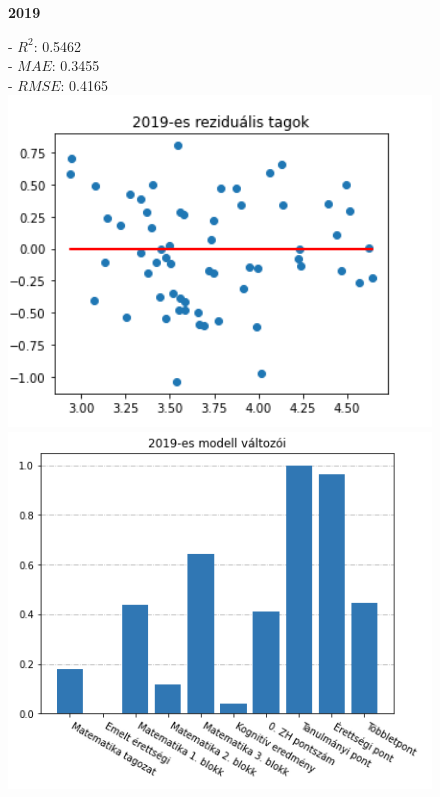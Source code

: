 \documentclass[12pt]{article}
\begin{document}
\begin{figure}[H]
    \centering
    \begin{minipage}[b]{0.4\textwidth}
    \begin{center}
    \textbf{2019}
    \end{center}
    \raggedright
    - $R^2$: 0.5462 \\
    - $MAE$: 0.3455 \\
    - $RMSE$: 0.4165 \\
    	\centering
        \includegraphics[width=1\textwidth, left]{kepek/residual2019.png} %
        \includegraphics[width=1\textwidth, left]{kepek/kumulalt2019.png} %

\end{minipage}
\end{figure}
\end{document}
